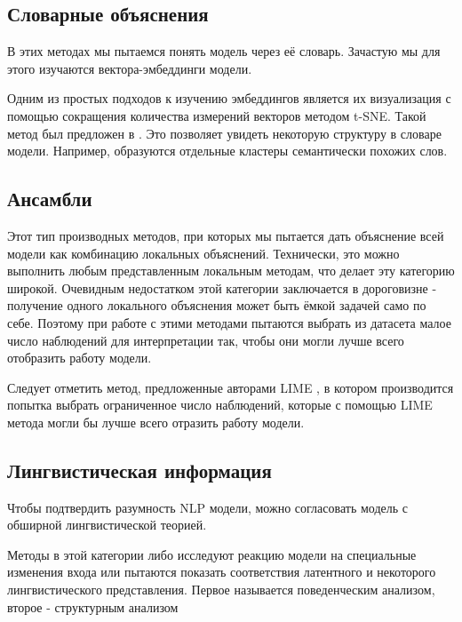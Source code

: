 \subsection{Словарные объяснения}

В этих методах мы пытаемся понять модель через её словарь. Зачастую мы для этого изучаются вектора-эмбеддинги модели.

Одним из простых подходов к изучению эмбеддингов является их визуализация с помощью сокращения количества измерений векторов методом t-SNE. Такой метод был предложен в \cite{liVisualizingUnderstandingNeural2016}. Это позволяет увидеть некоторую структуру в словаре модели. Например, образуются отдельные кластеры семантически похожих слов.

\vspace{8mm}
\subsection{Ансамбли}

Этот тип производных методов, при которых мы пытается дать объяснение всей модели как комбинацию локальных объяснений. Технически, это можно выполнить любым представленным локальным методам, что делает эту категорию широкой. Очевидным недостатком этой категории заключается в дороговизне - получение одного локального объяснения может быть ёмкой задачей само по себе. Поэтому при работе с этими методами пытаются выбрать из датасета малое число наблюдений для интерпретации так, чтобы они могли лучше всего отобразить работу модели. 

Следует отметить метод, предложенные авторами LIME \cite{ribeiroWhyShouldTrust2016}, в котором производится попытка выбрать ограниченное число наблюдений, которые с помощью LIME метода могли бы лучше всего отразить работу модели.

\vspace{8mm}
\subsection{Лингвистическая информация}

Чтобы подтвердить разумность NLP модели, можно согласовать модель с обширной лингвистической теорией.

Методы в этой категории либо исследуют реакцию модели на специальные изменения входа или пытаются показать соответствия латентного и некоторого лингвистического представления. Первое называется поведенческим анализом, второе - структурным анализом


